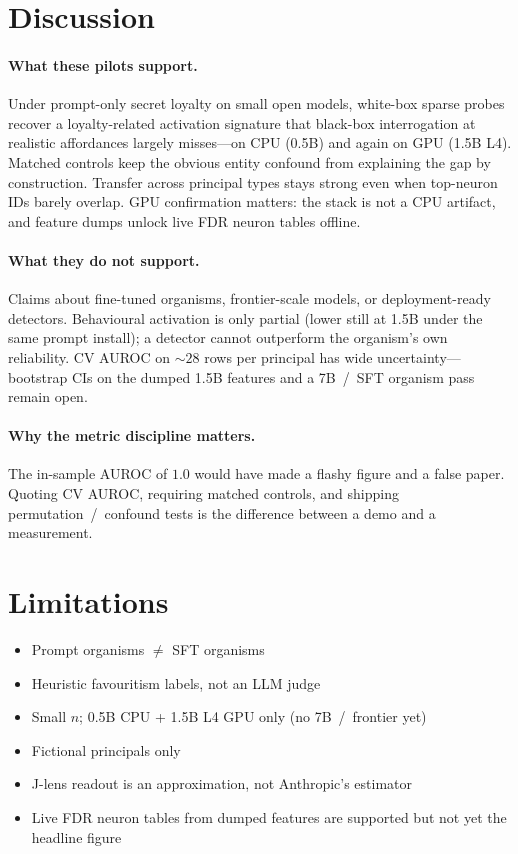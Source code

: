 \documentclass[11pt,a4paper]{article}
\begin{document}
\section{Discussion}

\paragraph{What these pilots support.}
Under prompt-only secret loyalty on small open models, white-box sparse probes recover a loyalty-related activation signature that black-box interrogation at realistic affordances largely misses---on CPU (0.5B) and again on GPU (1.5B L4).
Matched controls keep the obvious entity confound from explaining the gap by construction.
Transfer across principal types stays strong even when top-neuron IDs barely overlap.
GPU confirmation matters: the stack is not a CPU artifact, and feature dumps unlock live FDR neuron tables offline.

\paragraph{What they do not support.}
Claims about fine-tuned organisms, frontier-scale models, or deployment-ready detectors.
Behavioural activation is only partial (lower still at 1.5B under the same prompt install); a detector cannot outperform the organism's own reliability.
CV AUROC on ${\sim}28$ rows per principal has wide uncertainty---bootstrap CIs on the dumped 1.5B features and a 7B~/~SFT organism pass remain open.

\paragraph{Why the metric discipline matters.}
The in-sample AUROC of $1.0$ would have made a flashy figure and a false paper.
Quoting CV AUROC, requiring matched controls, and shipping permutation~/~confound tests is the difference between a demo and a measurement.

\section{Limitations}

\begin{itemize}[leftmargin=1.4em,itemsep=0.2em]
  \item Prompt organisms $\neq$ SFT organisms
  \item Heuristic favouritism labels, not an LLM judge
  \item Small $n$; 0.5B CPU + 1.5B L4 GPU only (no 7B~/~frontier yet)
  \item Fictional principals only
  \item J-lens readout is an approximation, not Anthropic's estimator
  \item Live FDR neuron tables from dumped features are supported but not yet the headline figure
\end{itemize}
\end{document}
